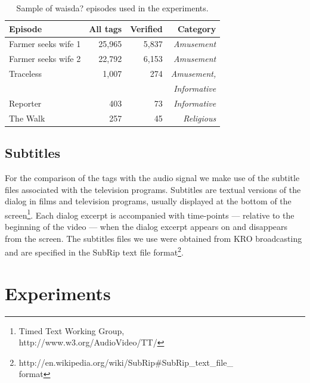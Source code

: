 \begin{table}[tb]
\centering
\begin{footnotesize}
\begin{tabular*}{\columnwidth}{@{\extracolsep{\fill}}lrrr}
\toprule
\textbf{Episode} \T \B & \textbf{All tags} & \textbf{Verified}&\textbf{Category} \\  
\midrule
Farmer seeks wife 1\B \T &25,965  & 5,837&\textit{Amusement}\\
Farmer seeks wife 2\B &22,792  &6,153  & \textit{Amusement}\\
Traceless\B& 1,007 &274& \textit{Amusement,}\\
&&& \textit{Informative}\\
Reporter\B&403& 73&\textit{Informative}\\
The Walk \B &257& 45&\textit{Religious}\\
\bottomrule
\end{tabular*}
\end{footnotesize}
\caption{Sample of waisda? episodes used in the experiments.}
\label{table:videos}
\end{table}

\subsection{Subtitles}\label{subtitles}

For the comparison of the tags with the audio signal we make use of the
subtitle files associated with the television programs. Subtitles are textual
versions of the dialog in films and television programs, usually displayed at
the bottom of the screen\footnote{Timed Text Working Group,\\ http://www.w3.org/AudioVideo/TT/}. Each dialog excerpt is accompanied with
time-points --- relative to the beginning of the video --- when the dialog
excerpt appears on and disappears from the screen. The subtitles files we use
were obtained from KRO broadcasting and are specified in the SubRip text file
format\footnote{http://en.wikipedia.org/wiki/SubRip\#SubRip\_text\_file\_\\format}.

\section{Experiments}\label{sec:experiments}

